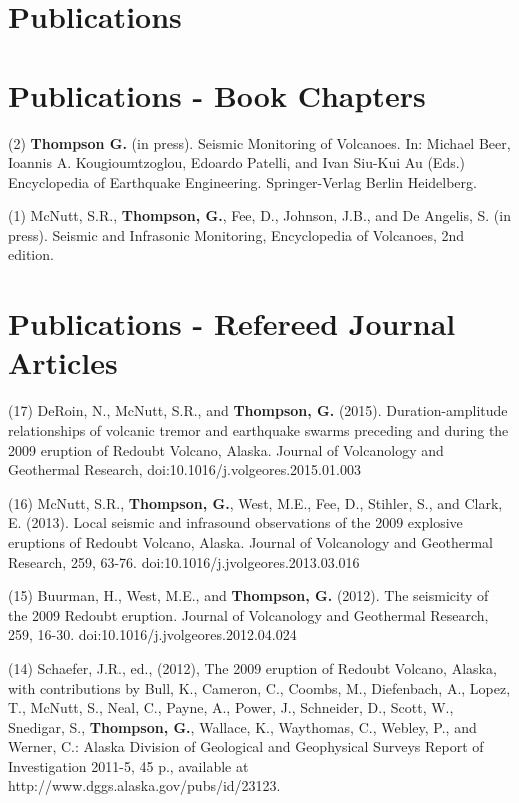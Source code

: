\documentclass[margin,line]{res}
\begin{document}
\begin{resume}
\section{\sc Publications}



\section{\sc Publications - Book Chapters}

	(2) {\bf Thompson G.} (in press). Seismic Monitoring of Volcanoes. In: Michael Beer, Ioannis A. Kougioumtzoglou, Edoardo Patelli, and Ivan Siu-Kui Au (Eds.) Encyclopedia of Earthquake Engineering. Springer-Verlag Berlin Heidelberg.
	
	(1) McNutt, S.R., {\bf Thompson, G.}, Fee, D., Johnson, J.B., and De Angelis, S. (in press). Seismic and Infrasonic Monitoring, Encyclopedia of Volcanoes, 2nd edition.

\section{\sc Publications - Refereed Journal Articles}

	(17) DeRoin, N., McNutt, S.R., and {\bf Thompson, G.} (2015). Duration-amplitude relationships of volcanic tremor and earthquake swarms preceding and during the 2009 eruption of Redoubt Volcano, Alaska. Journal of Volcanology and Geothermal Research, doi:10.1016/j.volgeores.2015.01.003
	
	(16) McNutt, S.R., {\bf Thompson, G.}, West, M.E., Fee, D., Stihler, S., and Clark, E. (2013). Local seismic and infrasound observations of the 2009 explosive eruptions of Redoubt Volcano, Alaska. Journal of Volcanology and Geothermal Research, 259, 63-76. doi:10.1016/j.jvolgeores.2013.03.016

	(15) Buurman, H., West, M.E., and {\bf Thompson, G.} (2012). The seismicity of the 2009 Redoubt eruption. Journal of Volcanology and Geothermal Research, 259, 16-30. doi:10.1016/j.jvolgeores.2012.04.024

	(14) Schaefer, J.R., ed., (2012), The 2009 eruption of Redoubt Volcano, Alaska, with contributions by Bull, K., Cameron, C., Coombs, M., Diefenbach, A., Lopez, T., McNutt, S., Neal, C., Payne, A., Power, J., Schneider, D., Scott, W., Snedigar, S., {\bf Thompson, G.}, Wallace, K., Waythomas, C., Webley, P., and Werner, C.: Alaska Division of Geological and Geophysical Surveys Report of Investigation 2011-5, 45 p., available at http://www.dggs.alaska.gov/pubs/id/23123.


\end{resume}
\end{document}
